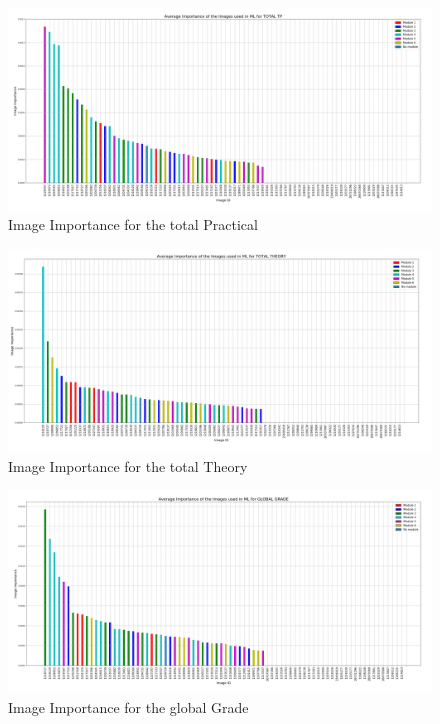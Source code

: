 \documentclass[a4paper,11pt]{report}
\numberwithin{figure}{section} %
\begin{document}
      \begin{figure}[H]
      \centering
      \includegraphics[width=.95\linewidth]{plots/im_importance_TOTAL_TP_2018-04-29_14_37_40.png}
      \caption{Image Importance for the total Practical}
      \label{fig:im_tot1}
      \end{figure}

      \begin{figure}[H]
      \centering
      \includegraphics[width=.95\linewidth]{plots/im_importance_TOTAL_THEORY_2018-05-02_23_31_57.png}
      \caption{Image Importance for the total Theory}
      \label{fig:im_tot2}
      \end{figure}

      \begin{figure}[H]
      \centering
      \includegraphics[width=.95\linewidth]{plots/im_importance_GLOBAL_GRADE_2018-05-02_20_56_13.png}
      \caption{Image Importance for the global Grade}
      \label{fig:im_tot3}
      \end{figure}
\end{document}
